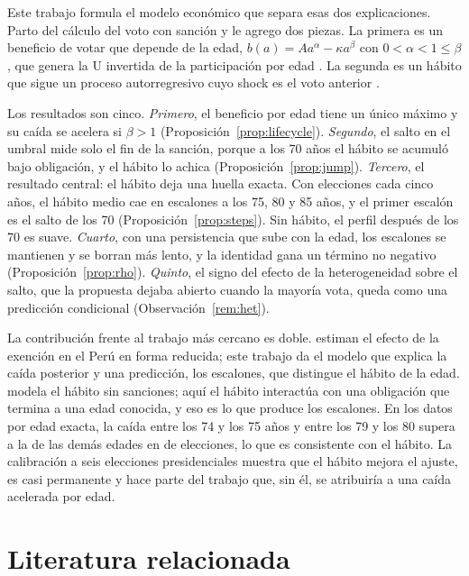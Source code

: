 \documentclass[11pt]{article}
\theoremstyle{definition}
\newcommand{\1}{\mathbbm{1}}
\begin{document}
Este trabajo formula el modelo económico que separa esas dos explicaciones. Parto del cálculo del
voto con sanción \citep{riker1968,panagopoulos2008} y le agrego dos piezas. La primera es un
beneficio de votar que depende de la edad, $b(a)=Aa^{\alpha}-\kappa a^{\beta}$ con
$0<\alpha<1\le\beta$, que genera la U invertida de la participación por edad \citep{bhatti2012}. La
segunda es un hábito que sigue un proceso autorregresivo cuyo shock es el voto anterior
\citep{fowler2006}.

Los resultados son cinco. \emph{Primero}, el beneficio por edad tiene un único máximo y su caída se
acelera si $\beta>1$ (Proposición~\ref{prop:lifecycle}). \emph{Segundo}, el salto en el umbral mide
solo el fin de la sanción, porque a los 70 años el hábito se acumuló bajo obligación, y el hábito lo
achica (Proposición~\ref{prop:jump}). \emph{Tercero}, el resultado central: el hábito deja una huella
exacta. Con elecciones cada cinco años, el hábito medio cae en escalones a los 75, 80 y 85 años, y el
primer escalón es el salto de los 70 (Proposición~\ref{prop:steps}). Sin hábito, el perfil después de
los 70 es suave. \emph{Cuarto}, con una persistencia que sube con la edad, los escalones se mantienen
y se borran más lento, y la identidad gana un término no negativo (Proposición~\ref{prop:rho}).
\emph{Quinto}, el signo del efecto de la heterogeneidad sobre el salto, que la propuesta dejaba
abierto cuando la mayoría vota, queda como una predicción condicional (Observación~\ref{rem:het}).

La contribución frente al trabajo más cercano es doble. \citet{gonzales2022} estiman el efecto de la
exención en el Perú en forma reducida; este trabajo da el modelo que explica la caída posterior y una
predicción, los escalones, que distingue el hábito de la edad. \citet{fowler2006} modela el hábito
sin sanciones; aquí el hábito interactúa con una obligación que termina a una edad conocida, y eso
es lo que produce los escalones. En los datos por edad exacta, la caída entre los 74 y los 75 años
y entre los 79 y los 80 supera a la de las demás edades en \stepsN{} de \stepsElections{} elecciones,
lo que es consistente con el hábito. La calibración a seis elecciones presidenciales muestra que el
hábito mejora el ajuste, es casi permanente y hace parte del trabajo que, sin él, se atribuiría a una
caída acelerada por edad.

\section{Literatura relacionada}\label{sec:lit}
\end{document}
